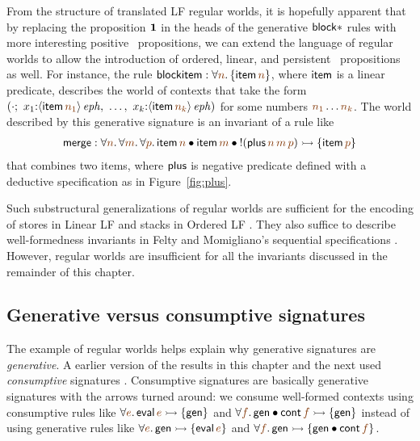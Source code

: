 From the structure of translated LF regular worlds, it is hopefully
apparent that by replacing the proposition $\mathbf{1}$ in the heads of the
generative ${\sf block*}$ rules with more interesting positive
\sls~propositions,  we can extend the language of regular
worlds to allow the introduction of ordered, linear, and persistent
\sls~propositions as well. For instance, the rule
${\sf blockitem} : 
\forall \lf{n}. \, \{ {\sf item}\,\lf{n} \}$,
where ${\sf item}$ is a linear predicate,
describes the world of contexts that take the form
$\left(\cdot; ~ x_1{:}\iseph{\susp{{\sf item}\,\lf{n_1}}}, ~
         \ldots, ~
         x_k{:}\iseph{\susp{{\sf item}\,\lf{n_k}}}\right)$
for some numbers $\lf{n_1}\ldots\lf{n_k}$. 
The world described by this generative signature is an invariant of a
rule like
\begin{align*}
  {\sf merge} : 
  \forall \lf{n}.\,\forall\lf{m}.\,\forall\lf{p}.\,
   {\sf item}\,\lf{n} \fuse
   {\sf item}\,\lf{m} \fuse
   {!}({\sf plus}\,\lf{n}\,\lf{m}\,\lf{p}) 
    \lefti \{ {\sf item}\,\lf{p} \}
\end{align*}
that combines two items,
where ${\sf plus}$ is  negative predicate defined with a deductive
specification as in
Figure~\ref{fig:plus}.  

Such substructural generalizations of regular worlds are sufficient
for the encoding of stores in Linear LF \cite{cervesato02linear} and
stacks in Ordered LF \cite{polakow01ordered}. They also suffice
to describe well-formedness invariants in Felty and Momigliano's
sequential specifications \cite{felty12hybrid}. However, regular
worlds are insufficient for all the
invariants discussed in the remainder of this chapter.

\subsection{Generative versus consumptive signatures}

The example of regular worlds helps explain why generative signatures are
{\it generative}. A earlier version of the results in this chapter and
the next used {\it consumptive} signatures
\cite{simmons10type}. Consumptive signatures are basically generative
signatures with the arrows turned around: we consume well-formed
contexts using consumptive rules like $\forall\lf{e}.\,{\sf
  eval}\,\lf{e} \lefti \{ {\sf gen} \}$ and $\forall \lf{f}.\,{\sf
  gen} \fuse {\sf cont}\,\lf{f} \lefti \{ {\sf gen} \}$ instead of
using generative 
rules like $\forall\lf{e}.\,{\sf gen}\lefti \{ {\sf eval}\,\lf{e} \}$
and $\forall \lf{f}.\,{\sf gen} \lefti \{ {\sf gen} \fuse {\sf
  cont}\,\lf{f} \}$. 

